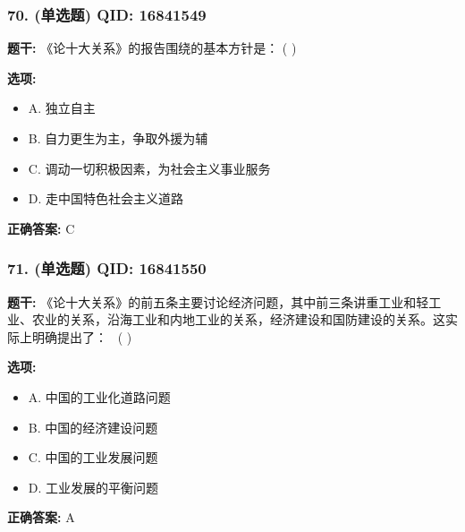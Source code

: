 \documentclass[12pt,UTF8]{ctexart}
\begin{document}
\subsubsection*{70. (单选题) \small QID: 16841549}

\textbf{题干:}
《论十大关系》的报告围绕的基本方针是： ( )

\textbf{选项:}
\begin{itemize}[leftmargin=*]

  \item A. 独立自主

  \item B. 自力更生为主，争取外援为辅

  \item C. 调动一切积极因素，为社会主义事业服务

  \item D. 走中国特色社会主义道路

\end{itemize}

\textbf{正确答案:}
C

\vspace{0.3em}\hrulefill\vspace{0.7em}

\subsubsection*{71. (单选题) \small QID: 16841550}

\textbf{题干:}
《论十大关系》的前五条主要讨论经济问题，其中前三条讲重工业和轻工业、农业的关系，沿海工业和内地工业的关系，经济建设和国防建设的关系。这实际上明确提出了：  ( )

\textbf{选项:}
\begin{itemize}[leftmargin=*]

  \item A. 中国的工业化道路问题

  \item B. 中国的经济建设问题

  \item C. 中国的工业发展问题

  \item D. 工业发展的平衡问题

\end{itemize}

\textbf{正确答案:}
A

\vspace{0.3em}\hrulefill\vspace{0.7em}
\end{document}
